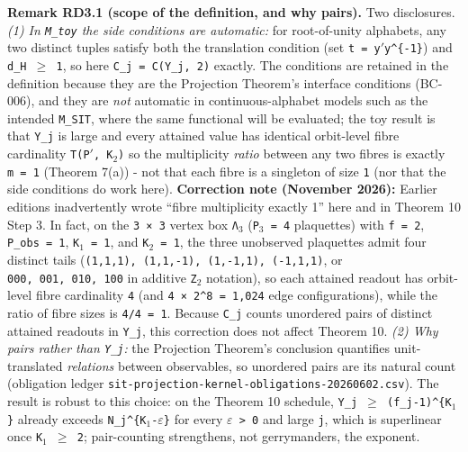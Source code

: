 \documentclass[
  american,
  11pt,
  letterpaper,
]{article}
\begin{document}
\textbf{Remark RD3.1 (scope of the definition, and why pairs).} Two disclosures. \emph{(1) In \texttt{M\_toy} the side conditions are automatic:} for root-of-unity alphabets, any two distinct tuples satisfy both the translation condition (set \texttt{t\ =\ y\ensuremath{'}y\^{}\{-1\}}) and \texttt{d\_H\ \ensuremath{\geq}\ 1}, so here \texttt{C\_j\ =\ C(\textbar{}Y\_j\textbar{},\ 2)} exactly. The conditions are retained in the definition because they are the Projection Theorem's interface conditions (BC-006), and they are \emph{not} automatic in continuous-alphabet models such as the intended \texttt{M\_SIT}, where the same functional will be evaluated; the toy result is that \texttt{Y\_j} is large and every attained value has identical orbit-level fibre cardinality \texttt{\textbar{}T(P\ensuremath{'},\ K\ensuremath{{}_{2}})\textbar{}} so the multiplicity \emph{ratio} between any two fibres is exactly \texttt{m\ =\ 1} (Theorem 7(a)) - not that each fibre is a singleton of size \texttt{1} (nor that the side conditions do work here). \textbf{Correction note (November 2026):} Earlier editions inadvertently wrote ``fibre multiplicity exactly 1'' here and in Theorem 10 Step 3. In fact, on the \texttt{3\ ×\ 3} vertex box \texttt{Λ\ensuremath{{}_{3}}} (\texttt{\textbar{}P\ensuremath{{}_{3}}\textbar{}\ =\ 4} plaquettes) with \texttt{f\ =\ 2}, \texttt{\textbar{}P\_obs\textbar{}\ =\ 1}, \texttt{K\ensuremath{{}_{1}}\ =\ 1}, and \texttt{K\ensuremath{{}_{2}}\ =\ 1}, the three unobserved plaquettes admit four distinct tails (\texttt{(1,1,1),\ (1,1,-1),\ (1,-1,1),\ (-1,1,1)}, or \texttt{000,\ 001,\ 010,\ 100} in additive \texttt{Z\ensuremath{{}_{2}}} notation), so each attained readout has orbit-level fibre cardinality \texttt{4} (and \texttt{4\ ×\ 2\^{}8\ =\ 1,024} edge configurations), while the ratio of fibre sizes is \texttt{4/4\ =\ 1}. Because \texttt{C\_j} counts unordered pairs of distinct attained readouts in \texttt{Y\_j}, this correction does not affect Theorem 10. \emph{(2) Why pairs rather than \texttt{\textbar{}Y\_j\textbar{}}:} the Projection Theorem's conclusion quantifies unit-translated \emph{relations} between observables, so unordered pairs are its natural count (obligation ledger \nolinkurl{sit-projection-kernel-obligations-20260602.csv}). The result is robust to this choice: on the Theorem 10 schedule, \texttt{\textbar{}Y\_j\textbar{}\ \ensuremath{\geq}\ (f\_j-1)\^{}\{K\ensuremath{{}_{1}}\}} already exceeds \texttt{N\_j\^{}\{K\ensuremath{{}_{1}}-\ensuremath{\varepsilon}\}} for every \texttt{\ensuremath{\varepsilon}\ \textgreater{}\ 0} and large \texttt{j}, which is superlinear once \texttt{K\ensuremath{{}_{1}}\ \ensuremath{\geq}\ 2}; pair-counting strengthens, not gerrymanders, the exponent.
\end{document}
